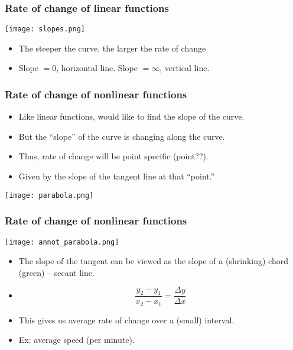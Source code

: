 \documentclass[xcolor=dvipsnames]{beamer} %
\begin{document}
\begin{frame}
\frametitle{Rate of change of linear functions}
\begin{center}
\texttt{[image: slopes.png]}
\end{center}
\begin{itemize}
    \setlength\itemsep{1em}
\item The steeper the curve, the larger the rate of change 
\item Slope $= 0$, horizontal line. Slope $= \infty$, vertical line. 
\end{itemize}
\end{frame}

\begin{frame}
\frametitle{Rate of change of nonlinear functions}
\begin{itemize}
\setlength\itemsep{1em}
\item Like linear functions, would like to find the slope of the curve.
\item But the ``slope'' of the curve is changing along the curve. 
\item Thus, rate of change will be point specific (point??).
\item Given by the slope of the tangent line at that ``point.'' 
\end{itemize}
\begin{center}
\texttt{[image: parabola.png]}
\end{center}
\end{frame}

\begin{frame}
\frametitle{Rate of change of nonlinear functions}
\begin{center}
\texttt{[image: annot\_parabola.png]}
\end{center}
\begin{itemize}
\item The slope of the tangent can be viewed as the slope of a (shrinking) chord (green) -- secant line. 
\item[] $$\frac{y_2 - y_1}{x_2 - x_1} = \frac{\Delta y}{\Delta x}$$
\item This gives us average rate of change over a (small) interval.
\item Ex: average speed (per minute). %
\end{itemize}
\end{frame}
\end{document}
